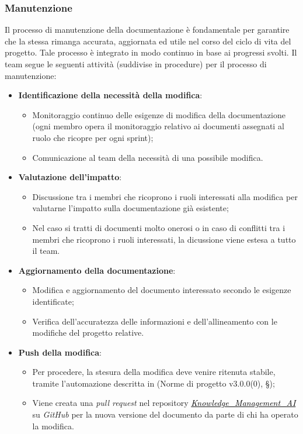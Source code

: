 \documentclass[10pt, a4paper]{article}
\begin{document}
\subsubsection{Manutenzione}
Il processo di manutenzione della documentazione è fondamentale per garantire che la stessa rimanga accurata, aggiornata ed utile nel corso del ciclo di vita del progetto. Tale processo è integrato in modo continuo in base ai progressi svolti. Il team segue le seguenti attività (suddivise in procedure) per il processo di manutenzione:
\begin{itemize}
    \item \textbf{Identificazione della necessità della modifica}:
    \begin{itemize}
        \item Monitoraggio continuo delle esigenze di modifica della documentazione (ogni membro opera il monitoraggio relativo ai documenti assegnati al ruolo che ricopre per ogni sprint);
        \item Comunicazione al team della necessità di una possibile modifica.
    \end{itemize} 
   
    \item \textbf{Valutazione dell'impatto}: 
    \begin{itemize}
        \item Discussione tra i membri che ricoprono i ruoli interessati alla modifica per valutarne l'impatto 
        sulla documentazione già esistente;
        \item Nel caso si tratti di documenti molto onerosi o in caso di conflitti tra i membri che ricoprono i ruoli interessati, la dicussione viene estesa a tutto il team.
    \end{itemize}
    \item \textbf{Aggiornamento della documentazione}: 
    \begin{itemize}
        \item Modifica e aggiornamento del documento interessato secondo le esigenze identificate;
        \item Verifica dell'accuratezza delle informazioni e dell'allineamento con le modifiche del progetto relative.
    \end{itemize}
    \item \textbf{Push della modifica}: 
    \begin{itemize}
        \item Per procedere, la stesura della modifica deve venire ritenuta stabile, tramite l'automazione descritta in 
        (Norme di progetto v3.0.0(0), \S {});
        \item Viene creata una \textit{pull request} nel repository \href{https://github.com/sweetcode-team/Knowledge_Management_AI}{\textcolor{black}{\textit{Knowledge\_Management\_AI}}} 
        su \textit{GitHub} per la nuova versione del documento da parte di chi ha operato la modifica.
    \end{itemize}
    

\end{itemize}
\end{document}
